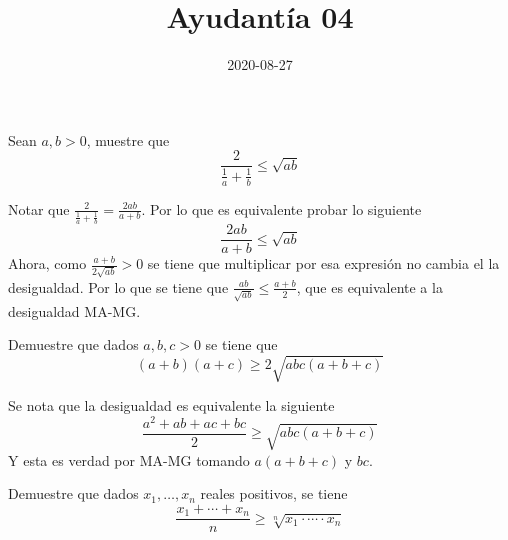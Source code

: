 \documentclass{ayudantia}
\title{Ayudantía 04}
\date{2020-08-27}
\begin{document}
\maketitle

\begin{prob}
    Sean \(a,b>0\), muestre que
    \begin{equation*}
        \frac2{\frac1a+\frac1b}\leq\sqrt{ab}
    \end{equation*}
\end{prob}

\begin{ans}
    \begin{sol}
        Notar que \(\frac2{\frac1a+\frac1b}=\frac{2ab}{a+b}\). Por lo que es equivalente probar lo siguiente
        \begin{equation*}
            \frac{2ab}{a+b}\leq\sqrt{ab}
        \end{equation*}
        Ahora, como \(\frac{a+b}{2\sqrt{ab}}>0\) se tiene que multiplicar por esa expresión no cambia el la desigualdad. Por lo que se tiene que \(\frac{ab}{\sqrt{ab}}\leq\frac{a+b}2\), que es equivalente a la desigualdad MA-MG.
    \end{sol}
\end{ans}


\begin{prob}
    Demuestre que dados \(a,b,c>0\) se tiene que
    \begin{equation*}
        (a+b)(a+c)\geq2\sqrt{abc(a+b+c)}
    \end{equation*}
\end{prob}

\begin{ans}
    \begin{sol}
        Se nota que la desigualdad es equivalente la siguiente
        \begin{equation*}
            \frac{a^2+ab+ac+bc}2\geq\sqrt{abc(a+b+c)}
        \end{equation*}
        Y esta es verdad por MA-MG tomando \(a(a+b+c)\) y \(bc\).
    \end{sol}
\end{ans}


\begin{prob}
    Demuestre que dados \(x_1,\dots,x_n\) reales positivos, se tiene
    \begin{equation*}
        \frac{x_1+\cdots+x_n}n\geq\sqrt[n]{x_1\cdot\cdots\cdot x_n}
    \end{equation*}
\end{prob}
\end{document}
